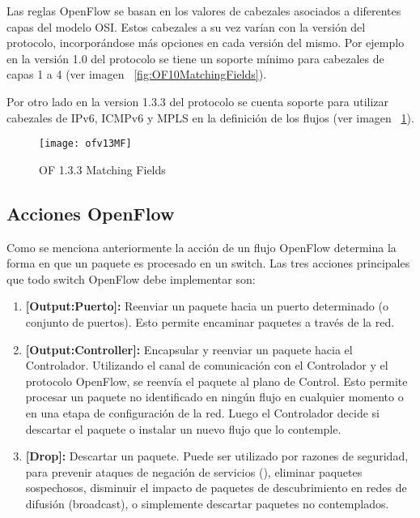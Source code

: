 Las reglas OpenFlow se basan en los valores de cabezales asociados a diferentes capas del modelo OSI. Estos cabezales a su vez varían con la versi\'on del protocolo, incorporándose m\'as opciones en cada versi\'on del mismo. Por ejemplo en la versi\'on 1.0 del protocolo se tiene un soporte mínimo para cabezales de capas 1 a 4 (ver imagen ~\ref{fig:OF10MatchingFields}).

Por otro lado en la version 1.3.3 del protocolo se cuenta soporte para utilizar cabezales de IPv6, ICMPv6 y MPLS en la definición de los flujos (ver imagen ~\ref{fig:OF13MatchingFields}).
 
\begin{figure}[ht] 
\centering    
\texttt{[image: ofv13MF]}
\caption[OF 1.3.3 Matching Fields]{OF 1.3.3 Matching Fields}
\label{fig:OF13MatchingFields}
\end{figure}

\subsection{Acciones OpenFlow}

Como se menciona anteriormente la acci\'on de un flujo OpenFlow determina la forma en que un paquete es procesado en un switch. Las tres acciones principales que todo switch OpenFlow debe implementar son:

\begin{enumerate}
\item \textbf{[Output:Puerto]:} Reenviar un paquete hacia un puerto determinado (o conjunto de puertos). Esto permite encaminar paquetes a través de la red.

\item \textbf{[Output:Controller]:} Encapsular y reenviar un paquete hacia el Controlador. Utilizando el canal de comunicación con el Controlador y el protocolo OpenFlow, se reenvía el paquete al plano de Control. Esto permite procesar un paquete no identificado en ningún flujo en cualquier momento o en una etapa de configuración de la red. Luego el Controlador decide si descartar el paquete o instalar un nuevo flujo que lo contemple.

\item \textbf{[Drop]:} Descartar un paquete. Puede ser utilizado por razones de seguridad, para prevenir ataques de negación de servicios (), eliminar paquetes sospechosos, disminuir el impacto de paquetes de descubrimiento en redes de difusión (broadcast), o simplemente descartar paquetes no contemplados.
\end{enumerate}

